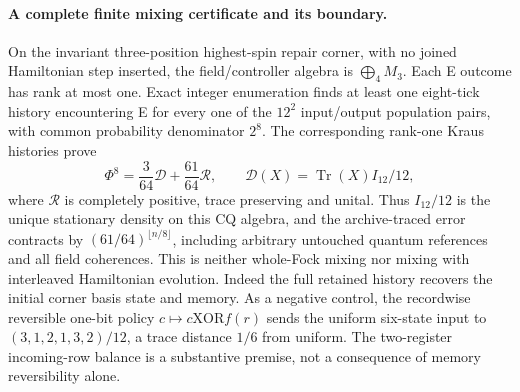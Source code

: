 \paragraph{A complete finite mixing certificate and its boundary.}
On the invariant three-position highest-spin repair corner, with no joined
Hamiltonian step inserted, the field/controller algebra is
$\bigoplus_4 M_3$. Each E outcome has rank at most one. Exact integer
enumeration finds at least one eight-tick history encountering E for every
one of the $12^2$ input/output population pairs, with common probability
denominator $2^8$. The corresponding rank-one Kraus histories prove
\[
 \Phi^8=\frac{3}{64}\mathcal D+\frac{61}{64}\mathcal R,
 \qquad\mathcal D(X)=\operatorname{Tr}(X)I_{12}/12,
\]
where $\mathcal R$ is completely positive, trace preserving and unital.
Thus $I_{12}/12$ is the unique stationary density on this CQ algebra, and
the archive-traced error contracts by $(61/64)^{\lfloor n/8\rfloor}$,
including arbitrary untouched quantum references and all field coherences.
This is neither whole-Fock mixing nor mixing with interleaved Hamiltonian
evolution. Indeed the full retained history recovers the initial corner
basis state and memory. As a negative control, the recordwise reversible
one-bit policy $c\mapsto c\mathbin{\mathrm{XOR}}f(r)$ sends the uniform
six-state input to $(3,1,2,1,3,2)/12$, a trace distance $1/6$ from uniform.
The two-register incoming-row balance is a substantive premise, not a
consequence of memory reversibility alone.
